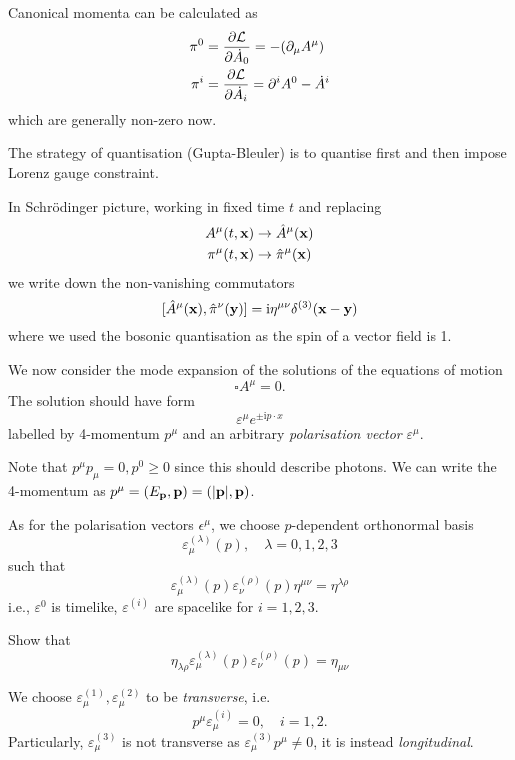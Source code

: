 \documentclass[a4paper,11pt]{article}
\begin{document}
	Canonical momenta can be calculated as 
	\begin{align*}
		\pi^0 & = \pdv{\mathcal{L}}{\dot A_0}  = - (\partial_\mu A^\mu)\\
		\pi^i & = \pdv{\mathcal{L}}{\dot A_i}  = \partial^i A^0 - \dot A^i
	\end{align*}
	which are generally non-zero now.

	The strategy of quantisation (Gupta-Bleuler) is to quantise first and then impose Lorenz gauge constraint. 

	In Schr\"odinger picture, working in fixed time $t$ and replacing
	\begin{align*}
		A^\mu(t,\vb x) &\to \hat A^\mu(\vb x)\\
		\pi^\mu(t,\vb x) & \to \hat \pi^\mu(\vb x)
	\end{align*}
	we write down the non-vanishing commutators
	\[
		[\hat A^\mu(\vb x), \hat \pi^\nu(\vb y)] = \mathrm{i}\eta ^{\mu \nu} \delta ^{(3)}(\vb x - \vb y)
	\]
	where we used the bosonic quantisation as the spin of a vector field is 1.

	We now consider the mode expansion of the solutions of the equations of motion 
	\[
		\square A^\mu = 0.
	\]
	The solution should have form 
	\[
		\varepsilon^\mu e ^{\pm \mathrm{i} p \cdot x}
	\]
	labelled by 4-momentum $p^\mu$ and an arbitrary \emph{polarisation vector} $\varepsilon^\mu$.

	Note that $p^\mu p_\mu = 0, p^0 \geq 0$ since this should describe photons. We can write the 4-momentum as $p^\mu = (E _{\vb p}, \vb p) = (\abs{\vb p}, \vb p)$. 
	
	As for the polarisation vectors $\epsilon^\mu$, we choose $p$-dependent orthonormal basis
	\[
		\varepsilon ^{(\lambda)}_\mu (p), \quad \lambda = 0,1,2,3
	\]
	such that 
	\[
		\varepsilon ^{(\lambda)}_\mu(p) \varepsilon ^{(\rho)}_\nu (p) \eta ^{\mu \nu} = \eta ^{\lambda \rho}
	\]
	i.e., $\varepsilon ^{0}$ is timelike, $\varepsilon ^{(i)}$ are spacelike for $i = 1,2,3$.

	\begin{exer}
		Show that 
		\[
			\eta _{\lambda \rho} \varepsilon ^{(\lambda)}_\mu (p) \varepsilon ^{(\rho)} _\nu (p)  = \eta _{\mu \nu}
		\]
	\end{exer}

	We choose $\varepsilon ^{(1)}_\mu, \varepsilon ^{(2)}_\mu$ to be \emph{transverse}, i.e.
	\[
		p^\mu \varepsilon ^{(i)}_\mu = 0, \quad i = 1,2.
	\]
	Particularly, $\varepsilon ^{(3)}_\mu$ is not transverse as $\varepsilon ^{(3)}_\mu p^\mu \neq 0$, it is instead \emph{longitudinal}.
\end{document}
